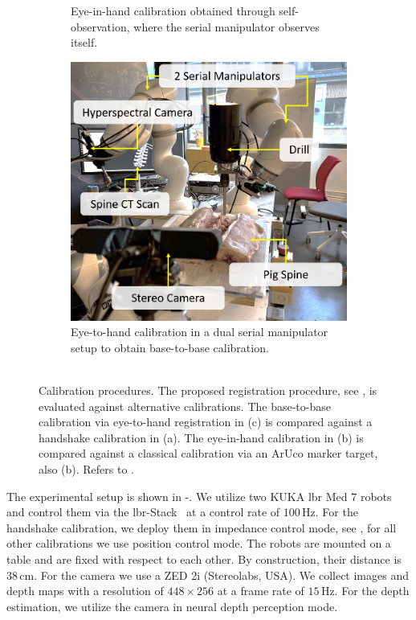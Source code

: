 \begin{figure}[tb]
\begin{subfigure}[b]{0.3\textwidth}
         \caption{Eye-in-hand calibration obtained through self-observation, where the serial manipulator observes itself.\\}
         \label{c1:fig:eye_in_hand}
     \end{subfigure}
     \hfill
     \begin{subfigure}[b]{0.3\textwidth}
         \centering
         \includegraphics[width=\textwidth]{fig/eye_to_hand.png}
         \caption{Eye-to-hand calibration in a dual serial manipulator setup to obtain base-to-base calibration.\\\\}
         \label{c1:fig:eye_to_hand}
     \end{subfigure}
    \caption{Calibration procedures. The proposed registration procedure, see , is evaluated against alternative calibrations. The base-to-base calibration via eye-to-hand registration in (c) is compared against a handshake calibration in (a). The eye-in-hand calibration in (b) is compared against a classical calibration via an ArUco marker target, also (b). Refers to .}
    \label{c1:fig:calibrations}
\end{figure}

The experimental setup is shown in -. We utilize two KUKA \gls{lbr} Med 7 robots and control them via the \gls{lbr}-Stack~\cite{huber2023lbr} at a control rate of $100\,\text{Hz}$. For the handshake calibration, we deploy them in impedance control mode, see , for all other calibrations we use position control mode. The robots are mounted on a table and are fixed with respect to each other. By construction, their distance is $38\,\text{cm}$. For the camera we use a ZED 2i (Stereolabs, USA). We collect images and depth maps with a resolution of $448 \times 256$ at a frame rate of $15\,\text{Hz}$. For the depth estimation, we utilize the camera in neural depth perception mode.

